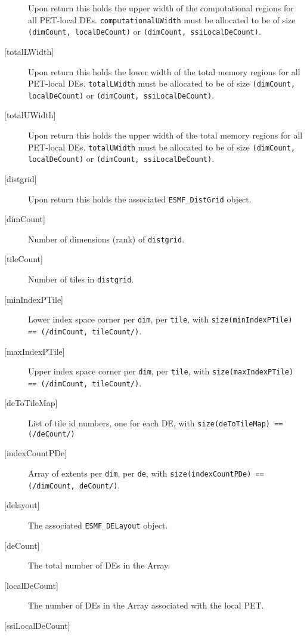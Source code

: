 \begin{description}
   Upon return this holds the upper width of the computational regions for
   all PET-local DEs. {\tt computationalUWidth} must be allocated to be
   of size {\tt (dimCount, localDeCount)} or
   {\tt (dimCount, ssiLocalDeCount)}.
   \item[{[totalLWidth]}]
   \begin{sloppypar}
   Upon return this holds the lower width of the total memory regions for
   all PET-local DEs. {\tt totalLWidth} must be allocated to be
   of size {\tt (dimCount, localDeCount)} or
   {\tt (dimCount, ssiLocalDeCount)}.
   \end{sloppypar}
   \item[{[totalUWidth]}]
   \begin{sloppypar}
   Upon return this holds the upper width of the total memory regions for
   all PET-local DEs. {\tt totalUWidth} must be allocated to be
   of size {\tt (dimCount, localDeCount)} or
   {\tt (dimCount, ssiLocalDeCount)}.
   \end{sloppypar}
   \item[{[distgrid]}]
   Upon return this holds the associated {\tt ESMF\_DistGrid} object.
   \item[{[dimCount]}]
   Number of dimensions (rank) of {\tt distgrid}.
   \item[{[tileCount]}]
   Number of tiles in {\tt distgrid}.
   \item[{[minIndexPTile]}]
   Lower index space corner per {\tt dim}, per {\tt tile}, with
   {\tt size(minIndexPTile) == (/dimCount, tileCount/)}.
   \item[{[maxIndexPTile]}]
   Upper index space corner per {\tt dim}, per {\tt tile}, with
   {\tt size(maxIndexPTile) == (/dimCount, tileCount/)}.
   \item[{[deToTileMap]}]
   List of tile id numbers, one for each DE, with
   {\tt size(deToTileMap) == (/deCount/)}
   \item[{[indexCountPDe]}]
   \begin{sloppypar}
   Array of extents per {\tt dim}, per {\tt de}, with
   {\tt size(indexCountPDe) == (/dimCount, deCount/)}.
   \end{sloppypar}
   \item[{[delayout]}]
   The associated {\tt ESMF\_DELayout} object.
   \item[{[deCount]}]
   The total number of DEs in the Array.
   \item[{[localDeCount]}]
   The number of DEs in the Array associated with the local PET.
   \item[{[ssiLocalDeCount]}]

\end{description}
